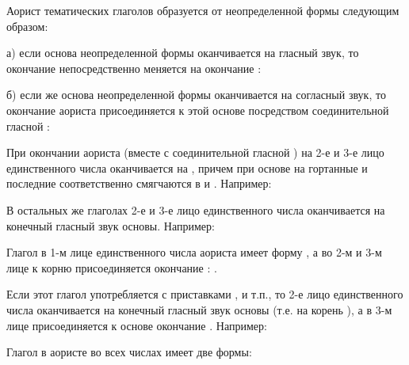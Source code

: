 \documentclass[11pt,a4paper,oneside]{memoir}
\begin{document}
    Аорист тематических глаголов образуется от неопределенной формы следующим образом:
    
    а) если основа неопределенной формы оканчивается на гласный звук, то окончание {} непосредственно меняется на окончание {}:

    \bigskip{}

    б) если же основа неопределенной формы оканчивается на согласный звук, то окончание аориста {} присоединяется к этой основе посредством соединительной гласной {}:

    \bigskip{}

    При окончании аориста (вместе с соединительной гласной {}) на {} 2-е и 3-е лицо единственного числа оканчивается на {}, причем при основе на гортанные {} и {} последние соответственно смягчаются в {} и {}. Например:

    \bigskip{}
    
    В остальных же глаголах 2-е и 3-е лицо единственного числа оканчивается на конечный гласный звук основы. Например:

    \bigskip{}

    Глагол {} в 1-м лице единственного числа аориста имеет форму {}, а во 2-м и 3-м лице к корню {} присоединяется окончание {}: {}.
    
    Если этот глагол употребляется с приставками {}, {} и т.п., то 2-е лицо единственного числа оканчивается на конечный гласный звук основы (т.е. на корень {}), а в 3-м лице присоединяется к основе окончание {}. Например:

    \bigskip{}
    
    Глагол {} в аористе во всех числах имеет две формы:
\end{document}
